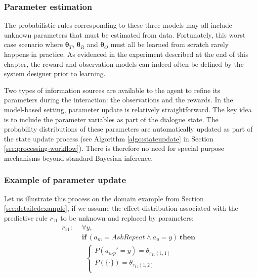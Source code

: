 \subsubsection*{Parameter estimation}
The probabilistic rules corresponding to these three models may all include unknown parameters that must be estimated from data.  Fortunately, this worst case scenario where $\boldsymbol\theta_T$, $\boldsymbol\theta_R$ and $\boldsymbol\theta_O$ must all be learned from scratch rarely happens in practice. As evidenced in the experiment described at the end of this chapter, the reward and observation models can indeed often be defined by the system designer prior to learning. 

Two types of information sources are available to the agent to refine its parameters during the interaction: the observations and the rewards.  In the model-based setting, parameter update is relatively straightforward.  The key idea is to include the parameter variables as part of the dialogue state.  The probability distributions of these parameters are automatically updated as part of the state update process (see Algorithm \ref{algo:stateupdate} in Section \ref{sec:processing-workflow}). There is therefore no need for special purpose mechanisms beyond standard Bayesian inference.

\subsubsection*{Example of parameter update}

Let us illustrate this process on the domain example from Section \ref{sec:detailedexample}, if we assume the effect distribution associated with the predictive rule $r_{11}$ to be unknown and replaced by parameters: 
\begin{align*}
r_{11}: \ \ & \forall y, \\ 
& \textbf{if} \ (a_m = \mathit{AskRepeat} \land a_u=y) \ \textbf{then} \\ 
& \; \;  \begin{cases} 
P(a_{u\mbox{-}p}' = y) = \theta_{r_{11}(1,1)} \\ 
P(\{\cdot\}) = \theta_{r_{11}(1,2)} \\ 
\end{cases}
\end{align*}



